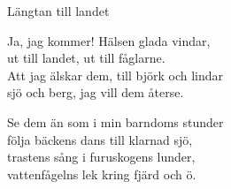 \begin{song}{Längtan till landet}

	
	\begin{center}
	\end{center}
	
	\vspace{.4cm}
	
	\showversenumber
	Ja, jag kommer! Hälsen glada vindar,\\
	ut till landet, ut till fåglarne.\\
	Att jag älskar dem, till björk och lindar\\
	sjö och berg, jag vill dem återse.\\
	\begin{repetition}
		Se dem än som i min barndoms stunder\\
		följa bäckens dans till klarnad sjö,\\
		trastens sång i furuskogens lunder,\\
		vattenfågelns lek kring fjärd och ö.
	\end{repetition}
	
\end{song}
